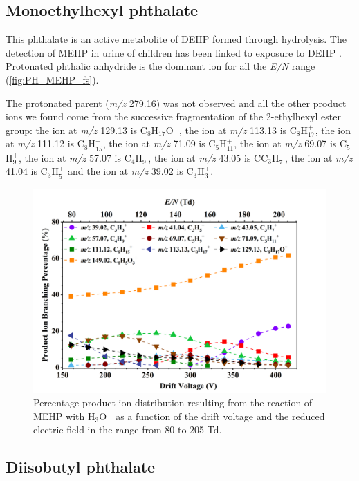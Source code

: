 \subsection{Monoethylhexyl phthalate}


This phthalate is an active metabolite of DEHP formed through hydrolysis. The detection of MEHP in urine of children has been linked to exposure to DEHP \cite{becker2004dehp}.
Protonated phthalic anhydride is the dominant ion for all the \textit{E/N} range (\autoref{fig:PH_MEHP_fs}).

The protonated parent (\textit{m/z} 279.16) was not observed and all the other product ions we found come from the successive fragmentation of the 2-ethylhexyl ester group:
the ion at \textit{m/z} 129.13 is C$_8$H$_{17}$O$^+$,
the ion at \textit{m/z} 113.13 is C$_8$H$_{17}^+$,
the ion at \textit{m/z} 111.12 is C$_8$H$_{15}^+$,  
the ion at \textit{m/z} 71.09 is C$_5$H$_{11}^+$,
the ion at \textit{m/z} 69.07 is C$_5$H$_9^+$,
the ion at \textit{m/z} 57.07 is C$_4$H$_9^+$, 
the ion at \textit{m/z} 43.05 is CC$_3$H$_7^+$,
the ion at \textit{m/z} 41.04 is C$_3$H$_5^+$
and
the ion at \textit{m/z} 39.02 is C$_3$H$_3^+$. 

\begin{figure}[htb]%
\centering
\includegraphics[height=0.4\textheight]{pics/MEHP-BR.png}
\caption{Percentage product ion distribution resulting from the reaction of MEHP with H$_3$O$^+$ as a function of the drift voltage and the reduced electric field in the range from 80 to 205 Td.}
\label{fig:PH_MEHP_fs}
\end{figure}



\subsection{Diisobutyl phthalate}

